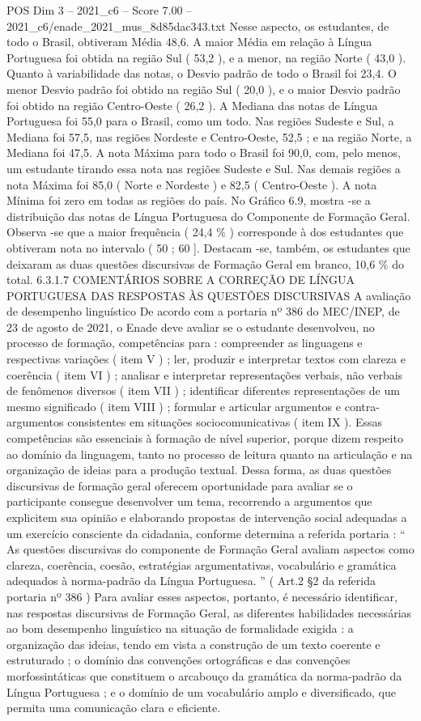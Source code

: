 \begin{textsample}{POS Dim 3 – 2021\_c6 – Score 7.00 – 2021\_c6/enade\_2021\_mus\_8d85dac343.txt}
Nesse aspecto, os estudantes, de todo o Brasil, obtiveram Média 48,6.
A maior Média em relação à Língua Portuguesa foi obtida na região Sul ( 53,2 ), e a menor, na região Norte ( 43,0 ).
Quanto à variabilidade das notas, o Desvio padrão de todo o Brasil foi 23,4.
O menor Desvio padrão foi obtido na região Sul ( 20,0 ), e o maior Desvio padrão foi obtido na região Centro-Oeste ( 26,2 ).
A Mediana das notas de Língua Portuguesa foi 55,0 para o Brasil, como um todo.
Nas regiões Sudeste e Sul, a Mediana foi 57,5, nas regiões Nordeste e Centro-Oeste, 52,5 ; e na região Norte, a Mediana foi 47,5.
A nota Máxima para todo o Brasil foi 90,0, com, pelo menos, um estudante tirando essa nota nas regiões Sudeste e Sul.
Nas demais regiões a nota Máxima foi 85,0 ( Norte e Nordeste ) e 82,5 ( Centro-Oeste ).
A nota Mínima foi zero em todas as regiões do país.
No Gráfico 6.9, mostra -se a distribuição das notas de Língua Portuguesa do Componente de Formação Geral.
Observa -se que a maior frequência ( 24,4 \% ) corresponde à dos estudantes que obtiveram nota no intervalo ( 50 ; 60 ].
Destacam -se, também, os estudantes que deixaram as duas questões discursivas de Formação Geral em branco, 10,6 \% do total. 6.3.1.7 COMENTÁRIOS SOBRE A CORREÇÃO DE LÍNGUA PORTUGUESA DAS RESPOSTAS ÀS QUESTÕES DISCURSIVAS A avaliação de desempenho linguístico De acordo com a portaria nº 386 do MEC/INEP, de 23 de agosto de 2021, o Enade deve avaliar se o estudante desenvolveu, no processo de formação, competências para : compreender as linguagens e respectivas variações ( item V ) ; ler, produzir e interpretar textos com clareza e coerência ( item VI ) ; analisar e interpretar representações verbais, não verbais de fenômenos diversos ( item VII ) ; identificar diferentes representações de um mesmo significado ( item VIII ) ; formular e articular argumentos e contra-argumentos consistentes em situações sociocomunicativas ( item IX ).
Essas competências são essenciais à formação de nível superior, porque dizem respeito ao domínio da linguagem, tanto no processo de leitura quanto na articulação e na organização de ideias para a produção textual.
Dessa forma, as duas questões discursivas de formação geral oferecem oportunidade para avaliar se o participante consegue desenvolver um tema, recorrendo a argumentos que explicitem sua opinião e elaborando propostas de intervenção social adequadas a um exercício consciente da cidadania, conforme determina a referida portaria : “ As questões discursivas do componente de Formação Geral avaliam aspectos como clareza, coerência, coesão, estratégias argumentativas, vocabulário e gramática adequados à norma-padrão da Língua Portuguesa. ” ( Art.2 §2 da referida portaria nº 386 ) Para avaliar esses aspectos, portanto, é necessário identificar, nas respostas discursivas de Formação Geral, as diferentes habilidades necessárias ao bom desempenho linguístico na situação de formalidade exigida : a organização das ideias, tendo em vista a construção de um texto coerente e estruturado ; o domínio das convenções ortográficas e das convenções morfossintáticas que constituem o arcabouço da gramática da norma-padrão da Língua Portuguesa ; e o domínio de um vocabulário amplo e diversificado, que permita uma comunicação clara e eficiente.

\end{textsample}
